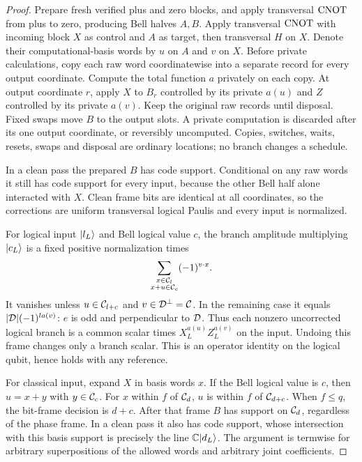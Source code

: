\begin{proof}
Prepare fresh verified plus and zero blocks, and apply transversal $\operatorname{CNOT}$ from plus to zero, producing Bell halves $A,B$. Apply transversal $\operatorname{CNOT}$ with incoming block $X$ as control and $A$ as target, then transversal $H$ on $X$. Denote their computational-basis words by $u$ on $A$ and $v$ on $X$. Before private calculations, copy each raw word coordinatewise into a separate record for every output coordinate. Compute the total function $a$ privately on each copy. At output coordinate $r$, apply $X$ to $B_r$ controlled by its private $a(u)$ and $Z$ controlled by its private $a(v)$. Keep the original raw records until disposal. Fixed swaps move $B$ to the output slots. A private computation is discarded after its one output coordinate, or reversibly uncomputed. Copies, switches, waits, resets, swaps and disposal are ordinary locations; no branch changes a schedule.

In a clean pass the prepared $B$ has code support. Conditional on any raw words it still has code support for every input, because the other Bell half alone interacted with $X$. Clean frame bits are identical at all coordinates, so the corrections are uniform transversal logical Paulis and every input is normalized.

For logical input $\lvert l_L\rangle$ and Bell logical value $c$, the branch amplitude multiplying $\lvert c_L\rangle$ is a fixed positive normalization times
\begin{equation}\label{eq:bellcharacter}
 \sum_{\substack{x\in\mathcal C_l\\x+u\in\mathcal C_c}}(-1)^{v\cdot x}.
\end{equation}
It vanishes unless $u\in\mathcal C_{l+c}$ and $v\in\mathcal D^\perp=\mathcal C$. In the remaining case it equals $|\mathcal D|(-1)^{l a(v)}$: $e$ is odd and perpendicular to $\mathcal D$. Thus each nonzero uncorrected logical branch is a common scalar times $X_L^{a(u)}Z_L^{a(v)}$ on the input. Undoing this frame changes only a branch scalar. This is an operator identity on the logical qubit, hence holds with any reference.

For classical input, expand $X$ in basis words $x$. If the Bell logical value is $c$, then $u=x+y$ with $y\in\mathcal C_c$. For $x$ within $f$ of $\mathcal C_d$, $u$ is within $f$ of $\mathcal C_{d+c}$. When $f\le q$, the bit-frame decision is $d+c$. After that frame $B$ has support on $\mathcal C_d$, regardless of the phase frame. In a clean pass it also has code support, whose intersection with this basis support is precisely the line $\mathbb C\lvert d_L\rangle$. The argument is termwise for arbitrary superpositions of the allowed words and arbitrary joint coefficients.


\end{proof}

